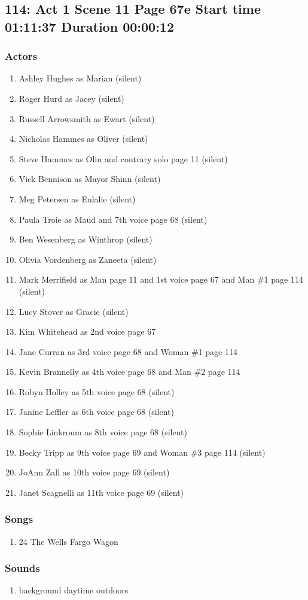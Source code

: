 \subsection{114: Act 1 Scene 11 Page 67e Start time 01:11:37 Duration 00:00:12}

\subsubsection{Actors}
\begin{enumerate}
\item Ashley Hughes as Marian (silent)
\item Roger Hurd as Jacey (silent)
\item Russell Arrowsmith as Ewart (silent)
\item Nicholas Hammes as Oliver (silent)
\item Steve Hammes as Olin and contrary solo page 11 (silent)
\item Vick Bennison as Mayor Shinn (silent)
\item Meg Petersen as Eulalie (silent)
\item Paula Troie as Maud and 7th voice page 68 (silent)
\item Ben Wesenberg as Winthrop (silent)
\item Olivia Vordenberg as Zaneeta (silent)
\item Mark Merrifield as Man page 11 and 1st voice page 67 and Man \#1 page 114 (silent)
\item Lucy Stover as Gracie (silent)
\item Kim Whitehead as 2nd voice page 67
\item Jane Curran as 3rd voice page 68 and Woman \#1 page 114
\item Kevin Brannelly as 4th voice page 68 and Man \#2 page 114
\item Robyn Holley as 5th voice page 68 (silent)
\item Janine Leffler as 6th voice page 68 (silent)
\item Sophie Linkroum as 8th voice page 68 (silent)
\item Becky Tripp as 9th voice page 69 and Woman \#3 page 114 (silent)
\item JoAnn Zall as 10th voice page 69 (silent)
\item Janet Scagnelli as 11th voice page 69 (silent)
\end{enumerate}

\subsubsection{Songs}
\begin{enumerate}
\item 24 The Wells Fargo Wagon
\end{enumerate}\subsubsection{Sounds}
\begin{enumerate}
\item background daytime outdoors
\end{enumerate}

